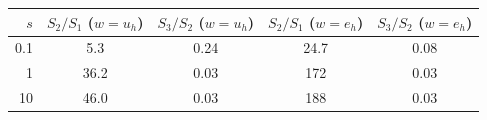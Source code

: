 \begin{tabular}{rcccc}
\toprule
$s$ & $S_2/S_1$ ($w=u_h$) & $S_3/S_2$ ($w=u_h$) & $S_2/S_1$ ($w=e_h$) & $S_3/S_2$ ($w=e_h$) \\
\midrule
0.1 & 5.3 & 0.24 & 24.7 & 0.08 \\
1 & 36.2 & 0.03 & 172 & 0.03 \\
10 & 46.0 & 0.03 & 188 & 0.03 \\
\bottomrule
\end{tabular}
